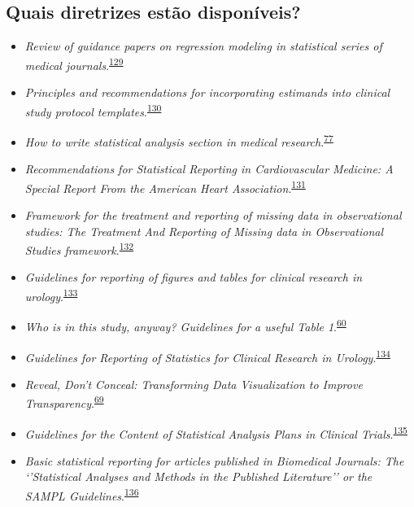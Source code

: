 \documentclass[
]{book}
\begin{document}
\hypertarget{quais-diretrizes-estuxe3o-disponuxedveis}{%
\subsection{Quais diretrizes estão disponíveis?}\label{quais-diretrizes-estuxe3o-disponuxedveis}}

\begin{itemize}
\item
  \emph{Review of guidance papers on regression modeling in statistical series of medical journals}.\textsuperscript{\protect\hyperlink{ref-Wallisch2022}{129}}
\item
  \emph{Principles and recommendations for incorporating estimands into clinical study protocol templates}.\textsuperscript{\protect\hyperlink{ref-Lynggaard2022}{130}}
\item
  \emph{How to write statistical analysis section in medical research}.\textsuperscript{\protect\hyperlink{ref-Dwivedi2022}{77}}
\item
  \emph{Recommendations for Statistical Reporting in Cardiovascular Medicine: A Special Report From the American Heart Association}.\textsuperscript{\protect\hyperlink{ref-Althouse2021}{131}}
\item
  \emph{Framework for the treatment and reporting of missing data in observational studies: The Treatment And Reporting of Missing data in Observational Studies framework}.\textsuperscript{\protect\hyperlink{ref-Lee2021}{132}}
\item
  \emph{Guidelines for reporting of figures and tables for clinical research in urology}.\textsuperscript{\protect\hyperlink{ref-Vickers2020}{133}}
\item
  \emph{Who is in this study, anyway? Guidelines for a useful Table 1}.\textsuperscript{\protect\hyperlink{ref-Hayes-Larson2019}{60}}
\item
  \emph{Guidelines for Reporting of Statistics for Clinical Research in Urology}.\textsuperscript{\protect\hyperlink{ref-assel2019}{134}}
\item
  \emph{Reveal, Don't Conceal: Transforming Data Visualization to Improve Transparency}.\textsuperscript{\protect\hyperlink{ref-Weissgerber2019}{69}}
\item
  \emph{Guidelines for the Content of Statistical Analysis Plans in Clinical Trials}.\textsuperscript{\protect\hyperlink{ref-Gamble2017}{135}}
\item
  \emph{Basic statistical reporting for articles published in Biomedical Journals: The `'Statistical Analyses and Methods in the Published Literature'' or the SAMPL Guidelines}.\textsuperscript{\protect\hyperlink{ref-Lang2015}{136}}

\end{itemize}
\end{document}
